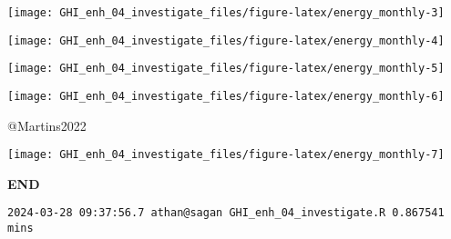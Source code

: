 \documentclass[
  10pt,
  a4paper,oneside]{article}
\begin{document}
\begin{center}\texttt{[image: GHI\_enh\_04\_investigate\_files/figure-latex/energy\_monthly-3]} \end{center}

\begin{center}\texttt{[image: GHI\_enh\_04\_investigate\_files/figure-latex/energy\_monthly-4]} \end{center}

\begin{center}\texttt{[image: GHI\_enh\_04\_investigate\_files/figure-latex/energy\_monthly-5]} \end{center}

\begin{center}\texttt{[image: GHI\_enh\_04\_investigate\_files/figure-latex/energy\_monthly-6]} \end{center}

@Martins2022

\begin{center}\texttt{[image: GHI\_enh\_04\_investigate\_files/figure-latex/energy\_monthly-7]} \end{center}

\textbf{END}

\begin{verbatim}
2024-03-28 09:37:56.7 athan@sagan GHI_enh_04_investigate.R 0.867541 mins
\end{verbatim}
\end{document}
